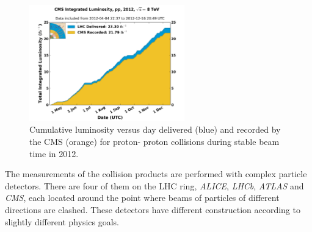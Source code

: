 \begin{figure}[t]
  \centering
  \includegraphics[width=0.6\textwidth]{02_experimental_setup/plots/int_lumi_per_day_cumulative_pp_2012.png}
  \caption{Cumulative luminosity versus day delivered (blue) and recorded by the CMS (orange) for proton-
  proton collisions during stable beam time in 2012.}
  \label{fig:LumiCMS}
\end{figure}



The measurements of the collision products are performed with complex particle detectors. There are four of them on the 
LHC ring, \textit{ALICE}, \textit{LHCb}, \textit{ATLAS} and \textit{CMS}, each located around the point where beams 
of particles of different directions are clashed.
These detectors have different construction according to slightly different physics goals.

